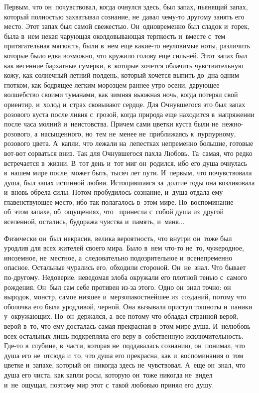 \lettrine[lines=3, loversize=0.1]{П}{}ервым, что он~почувствовал, когда очнулся здесь, был запах, пьянящий запах, который полностью захватывал сознание, не~давал чему-то другому занять его место.
Этот запах был самой свежестью.
Он~одновременно был сладок и~горек, была в~нем некая чарующая околдовывающая терпкость и~вместе с~тем притягательная мягкость, были в~нем еще какие-то неуловимые ноты, различить которые было едва возможно, что кружило голову еще сильней.
Этот запах был как весенние бархатные сумерки, в~которые хочется облачить чувствительную кожу, как солнечный летний полдень, который хочется выпить до~дна одним глотком, как бодрящее легким морозцем раннее утро осени, дарующее волшебство своими туманами, как зимняя вьюжная ночь, когда потерял свой ориентир, и~холод и~страх сковывают сердце.
Для Очнувшегося это был запах розового куста после ливня с~грозой, когда природа еще находится в~напряжении после часа молний и~неистовства.
Причем сами цветки куста были не~нежно-розового, а~насыщенного, но~тем не~менее не~приближаясь к~пурпурному, розового цвета.
А~капли, что лежали на~лепестках непременно большие, готовые вот-вот сорваться вниз.
Так для Очнувшегося пахла Любовь.
Та~самая, что редко встречается в~жизни.
В~тот день и~тот миг он~родился, ибо его душа очнулась в~нашем мире после, может быть, тысяч лет пути.
И~первым, что почувствовала душа, был запах истинной любви.
Истощившаяся за~долгие годы она возликовала и~вновь обрела силы.
Потом пробудилось сознание, и~душа отдала ему главенствующее место, ибо так полагалось в~этом мире.
Но~воспоминание об~этом запахе, об~ощущениях, что ~принесла с~собой душа из~другой вселенной, остались, будоража чувства и~память, и~маня...
 
Физически он~был некрасив, велика вероятность, что внутри он~тоже был уродлив для всех жителей своего мира.
Было в~нем что-то не~то, чужеродное, иноземное, не~местное, а~следовательно подозрительное и~всенепременно опасное.
Остальные чурались его, обходили стороной.
Он~не~знал.
Что бывает по-другому.
Недоверие, неведомая злоба окружали его плотной тенью с~самого рождения.
Он~был сам себе противен из-за этого.
Одно он~знал точно: он выродок, монстр, самое низшее и~мерзопакостнейшее из~созданий, потому что оболочка его была уродливой, черной.
Она вызывала приступ тошноты и~паники у~окружающих.
Но~он~держался, а~все потому что обладал странной верой, верой в~то, что ему досталась самая прекрасная в~этом мире душа.
И~нелюбовь всех остальных лишь подкрепляла его веру в~собственную исключительность.
Где-то в~глубине, в~части, которая не~поддавалась сознанию, он~понимал, что душа его не~отсюда и~то, что душа его прекрасна, как и~воспоминания о~том цветке и~запахе, который он~никогда здесь не~чувствовал.
А~еще он~знал, что душа его чиста, как капли росы, которую он~тоже никогда не~видел и~не~ощущал, поэтому мир этот с~такой любовью принял его душу.

